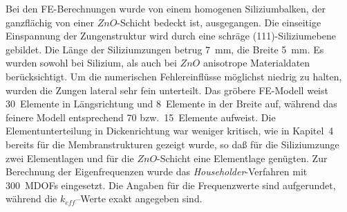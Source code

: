 %
%
Bei den FE-Berechnungen wurde von einem homogenen Siliziumbalken, der
ganzflächig von einer $ZnO$-Schicht bedeckt ist, ausgegangen. Die einseitige
Einspannung der Zungenstruktur wird durch eine schräge (111)-Siliziumebene
gebildet. Die Länge der Siliziumzungen betrug 7~mm, die Breite 5~mm.
Es wurden sowohl bei Silizium, als auch bei $ZnO$ anisotrope Materialdaten
\cite{LB82} berücksichtigt. Um die numerischen Fehlereinflüsse möglichst
niedrig zu halten, wurden die Zungen lateral sehr fein unterteilt.
Das gröbere FE-Modell weist 30~Elemente in Längsrichtung und 8~Elemente in
der Breite auf, während das feinere Modell entsprechend 70 bzw.\ 15~Elemente
aufweist. Die Elementunterteilung in Dickenrichtung war weniger kritisch,
wie in Kapitel~4 bereits für die Membranstrukturen gezeigt wurde, so daß
für die Siliziumzunge zwei Elementlagen und für die $ZnO$-Schicht eine
Elementlage genügten. Zur Berechnung der Eigenfrequenzen wurde das
{\sl Householder}-Verfahren mit 300~MDOFs eingesetzt. Die Angaben für die
Frequenzwerte sind aufgerundet, während die $k_{eff}$--Werte exakt
angegeben sind.\\
